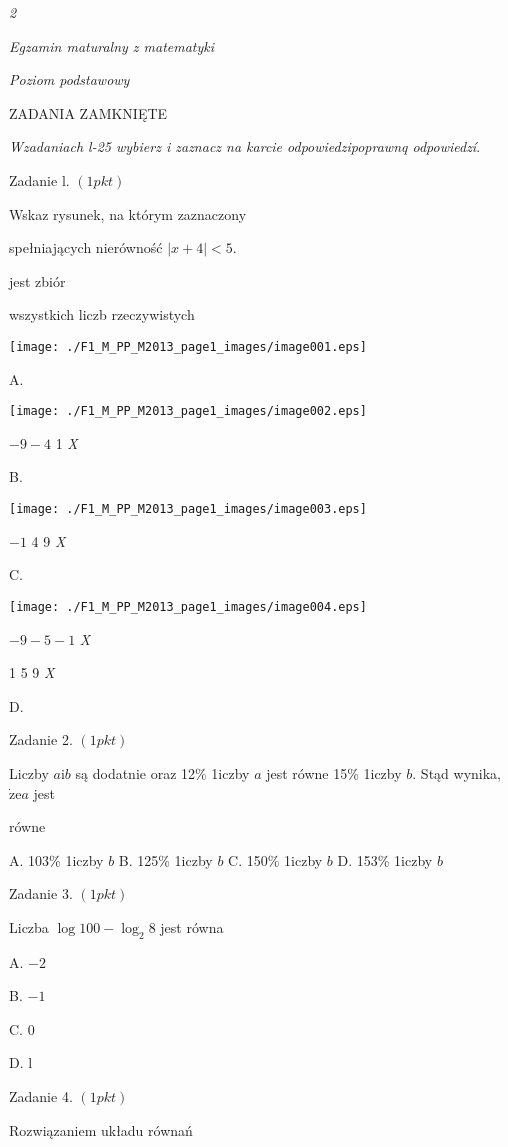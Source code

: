 \documentclass[a4paper,12pt]{article}
\begin{document}
{\it 2}

{\it Egzamin maturalny z matematyki}

{\it Poziom podstawowy}

ZADANIA ZAMKNIĘTE

{\it Wzadaniach l-25 wybierz i zaznacz na karcie odpowiedzipoprawnq odpowiedzí}.

Zadanie l. $(1pkt)$

Wskaz rysunek, na którym zaznaczony

spełniających nierówność $|x+4|<5.$

jest zbiór

wszystkich liczb rzeczywistych
\begin{center}
\texttt{[image: ./F1\_M\_PP\_M2013\_page1\_images/image001.eps]}
\end{center}
A.
\begin{center}
\texttt{[image: ./F1\_M\_PP\_M2013\_page1\_images/image002.eps]}
\end{center}
$-9  -4$  1  {\it X}

B.
\begin{center}
\texttt{[image: ./F1\_M\_PP\_M2013\_page1\_images/image003.eps]}
\end{center}
$-1$  4 9  {\it X}

C.
\begin{center}
\texttt{[image: ./F1\_M\_PP\_M2013\_page1\_images/image004.eps]}
\end{center}
$-9  -5  -1$  {\it X}

1 5  9  {\it X}

D.

Zadanie 2. $(1pkt)$

Liczby $a\mathrm{i}b$ są dodatnie oraz 12\% 1iczby $a$ jest równe 15\% 1iczby $b$. Stąd wynika, $\dot{\mathrm{z}}\mathrm{e}a$ jest

równe

A. 103\% 1iczby $b$ B. 125\% 1iczby $b$ C. 150\% 1iczby $b$ D. 153\% 1iczby $b$

Zadanie 3. $(1pkt)$

Liczba $\log 100-\log_{2}8$ jest równa

A. $-2$

B. $-1$

C. 0

D. l

Zadanie 4. $(1pkt)$

Rozwiązaniem układu równań 
\end{document}
